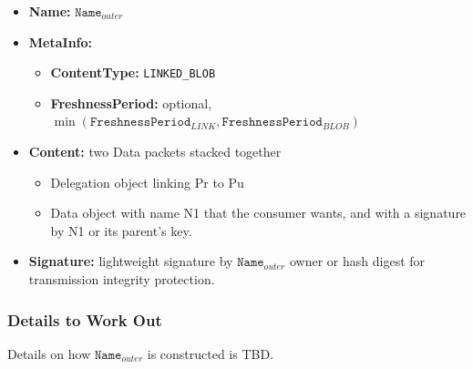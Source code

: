 \documentclass[10pt]{article}
\begin{document}
\begin{itemize}
\item \textbf{Name:} $\mathtt{Name}_{outer}$
\item \textbf{MetaInfo:}
  \begin{itemize}
  \item \textbf{ContentType:} \verb|LINKED_BLOB|
  \item \textbf{FreshnessPeriod:} optional, $\min(\mathtt{FreshnessPeriod}_{LINK}, \mathtt{FreshnessPeriod}_{BLOB})$
  \end{itemize}
\item \textbf{Content:} two Data packets stacked together
  \begin{itemize}
  \item Delegation object linking Pr to Pu
  \item Data object with name N1 that the consumer wants, and with a signature by N1 or its parent's key.
  \end{itemize}

\item \textbf{Signature:} lightweight signature by $\mathtt{Name}_{outer}$ owner or hash digest for transmission integrity protection.

\end{itemize}


\subsubsection{Details to Work Out}


Details on how $\mathtt{Name}_{outer}$ is constructed is TBD.

% 
% 
\end{document}
